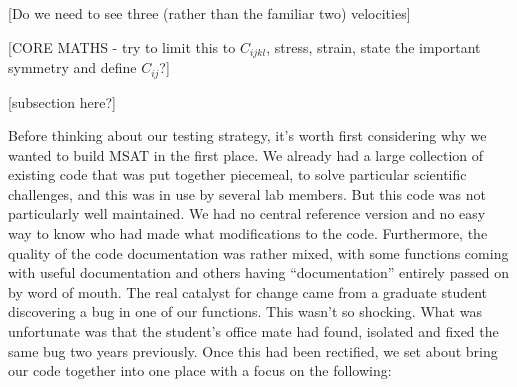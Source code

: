 \documentclass[11pt, oneside]{article}   	%
\begin{document}
[Do we need to see three (rather than the familiar two) velocities]

[CORE MATHS - try to limit this to $C_{ijkl}$, stress, strain, state the important 
symmetry and define $C_{ij}$?]

[subsection here?]

Before thinking about our testing strategy, it's worth first considering why
we wanted to build MSAT in the first place. We already had a large collection 
of existing code that was put together piecemeal, to solve particular scientific
challenges, and this was in use by several lab members. But this code was not
particularly well maintained. We had no central reference version and no easy
way to know who had made what modifications to the code. Furthermore, the 
quality of the code documentation was rather mixed, with some functions coming
with useful documentation and others having ``documentation'' entirely passed on
by word of mouth. The real catalyst for change came from a graduate student 
discovering a bug in one of our functions. This wasn't so shocking. What was 
unfortunate was that the student's office mate had found, isolated and fixed the
same bug two years previously. Once this had been rectified, we set about 
bring our code together into one place with a focus on the following:
\end{document}
